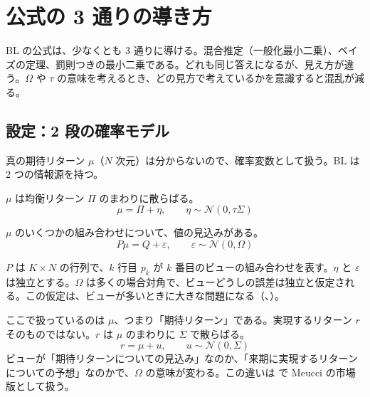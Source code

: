 \chapter{公式の 3 通りの導き方}\label{ch:derive}

BL の公式は、少なくとも 3 通りに導ける。混合推定（一般化最小二乗）、ベイズの定理、罰則つきの最小二乗である。どれも同じ答えになるが、見え方が違う。$\Omega$ や $\tau$ の意味を考えるとき、どの見方で考えているかを意識すると混乱が減る。

\section{設定：2 段の確率モデル}

真の期待リターン $\mu$（$N$ 次元）は分からないので、確率変数として扱う。BL は 2 つの情報源を持つ。

\begin{description}[leftmargin=2em,style=nextline]
\item[均衡（事前の情報）] $\mu$ は均衡リターン $\Pi$ のまわりに散らばる。
\begin{equation}
\mu=\Pi+\eta,\qquad \eta\sim\mathcal N(0,\tau\Sigma)
\label{eq:prior}
\end{equation}
\item[ビュー（追加の情報）] $\mu$ のいくつかの組み合わせについて、値の見込みがある。
\begin{equation}
P\mu=Q+\varepsilon,\qquad \varepsilon\sim\mathcal N(0,\Omega)
\label{eq:view}
\end{equation}
\end{description}

$P$ は $K\times N$ の行列で、$k$ 行目 $p_k$ が $k$ 番目のビューの組み合わせを表す。$\eta$ と $\varepsilon$ は独立とする。$\Omega$ は多くの場合対角で、ビューどうしの誤差は独立と仮定される。この仮定は、ビューが多いときに大きな問題になる（、）。

ここで扱っているのは $\mu$、つまり「期待リターン」である。実現するリターン $r$ そのものではない。$r$ は $\mu$ のまわりに $\Sigma$ で散らばる。
\begin{equation}
r=\mu+u,\qquad u\sim\mathcal N(0,\Sigma)
\label{eq:return}
\end{equation}
ビューが「期待リターンについての見込み」なのか、「来期に実現するリターンについての予想」なのかで、$\Omega$ の意味が変わる。この違いは  で Meucci の市場版として扱う。

